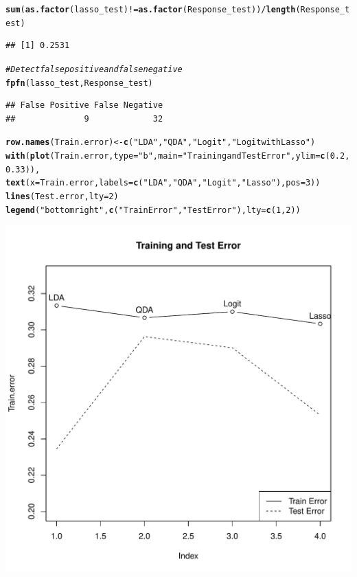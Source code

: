 \documentclass{article}\usepackage[]{graphicx}\usepackage[]{color}
\makeatletter
\def\maxwidth{ %
  \ifdim\Gin@nat@width>\linewidth
    \linewidth
  \else
    \Gin@nat@width
  \fi
}
\newcommand{\hlnum}[1]{\textcolor[rgb]{0.686,0.059,0.569}{#1}}%
\newcommand{\hlstr}[1]{\textcolor[rgb]{0.192,0.494,0.8}{#1}}%
\newcommand{\hlcom}[1]{\textcolor[rgb]{0.678,0.584,0.686}{\textit{#1}}}%
\newcommand{\hlopt}[1]{\textcolor[rgb]{0,0,0}{#1}}%
\newcommand{\hlstd}[1]{\textcolor[rgb]{0.345,0.345,0.345}{#1}}%
\newcommand{\hlkwb}[1]{\textcolor[rgb]{0.69,0.353,0.396}{#1}}%
\newcommand{\hlkwc}[1]{\textcolor[rgb]{0.333,0.667,0.333}{#1}}%
\newcommand{\hlkwd}[1]{\textcolor[rgb]{0.737,0.353,0.396}{\textbf{#1}}}%
\newenvironment{kframe}{%
 \def\at@end@of@kframe{}%
 \ifinner\ifhmode%
  \def\at@end@of@kframe{\end{minipage}}%
  \begin{minipage}{\columnwidth}%
 \fi\fi%
 \def\FrameCommand##1{\hskip\@totalleftmargin \hskip-\fboxsep
 \colorbox{shadecolor}{##1}\hskip-\fboxsep
     \hskip-\linewidth \hskip-\@totalleftmargin \hskip\columnwidth}%
 \MakeFramed {\advance\hsize-\width
   \@totalleftmargin\z@ \linewidth\hsize
   \@setminipage}}%
 {\par\unskip\endMakeFramed%
 \at@end@of@kframe}
\newenvironment{knitrout}{}{} %
\makeatother
\begin{document}
\begin{knitrout}
\begin{kframe}
\begin{alltt}
\hlkwd{sum}\hlstd{(}\hlkwd{as.factor}\hlstd{(lasso_test)} \hlopt{!=} \hlkwd{as.factor}\hlstd{(Response_test))}\hlopt{/}\hlkwd{length}\hlstd{(Response_test)}
\end{alltt}
\begin{verbatim}
## [1] 0.2531
\end{verbatim}
\begin{alltt}
\hlcom{# Detect false positive and false negative}
\hlkwd{fpfn}\hlstd{(lasso_test, Response_test)}
\end{alltt}
\begin{verbatim}
## False Positive False Negative 
##              9             32
\end{verbatim}
\begin{alltt}
\hlkwd{row.names}\hlstd{(Train.error)} \hlkwb{<-} \hlkwd{c}\hlstd{(}\hlstr{"LDA"}\hlstd{,} \hlstr{"QDA"}\hlstd{,} \hlstr{"Logit"}\hlstd{,} \hlstr{"Logit with Lasso"}\hlstd{)}
\hlkwd{with}\hlstd{(}\hlkwd{plot}\hlstd{(Train.error,} \hlkwc{type} \hlstd{=} \hlstr{"b"}\hlstd{,} \hlkwc{main} \hlstd{=} \hlstr{"Training and Test Error"}\hlstd{,} \hlkwc{ylim} \hlstd{=} \hlkwd{c}\hlstd{(}\hlnum{0.2}\hlstd{,} \hlnum{0.33}\hlstd{)),}
    \hlkwd{text}\hlstd{(}\hlkwc{x} \hlstd{= Train.error,} \hlkwc{labels} \hlstd{=} \hlkwd{c}\hlstd{(}\hlstr{"LDA"}\hlstd{,} \hlstr{"QDA"}\hlstd{,} \hlstr{"Logit"}\hlstd{,} \hlstr{"Lasso"}\hlstd{),} \hlkwc{pos} \hlstd{=} \hlnum{3}\hlstd{))}
\hlkwd{lines}\hlstd{(Test.error,} \hlkwc{lty} \hlstd{=} \hlnum{2}\hlstd{)}
\hlkwd{legend}\hlstd{(}\hlstr{"bottomright"}\hlstd{,} \hlkwd{c}\hlstd{(}\hlstr{"Train Error"}\hlstd{,} \hlstr{"Test Error"}\hlstd{),} \hlkwc{lty} \hlstd{=} \hlkwd{c}\hlstd{(}\hlnum{1}\hlstd{,} \hlnum{2}\hlstd{))}
\end{alltt}
\end{kframe}
\includegraphics[width=\maxwidth]{figure/minimal-SouthAfrica2} 

\end{knitrout}
\end{document}
